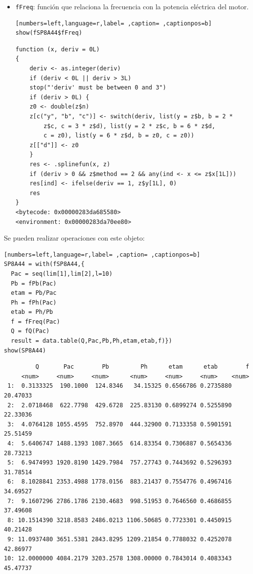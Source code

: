 \begin{itemize}
\begin{itemize}
\item \texttt{fFreq}: función que relaciona la frecuencia con la potencia eléctrica del motor.
\begin{lstlisting}[numbers=left,language=r,label= ,caption= ,captionpos=b]
show(fSP8A44$fFreq)
\end{lstlisting}

\begin{verbatim}
function (x, deriv = 0L) 
{
    deriv <- as.integer(deriv)
    if (deriv < 0L || deriv > 3L) 
	stop("'deriv' must be between 0 and 3")
    if (deriv > 0L) {
	z0 <- double(z$n)
	z[c("y", "b", "c")] <- switch(deriv, list(y = z$b, b = 2 * 
	    z$c, c = 3 * z$d), list(y = 2 * z$c, b = 6 * z$d, 
	    c = z0), list(y = 6 * z$d, b = z0, c = z0))
	z[["d"]] <- z0
    }
    res <- .splinefun(x, z)
    if (deriv > 0 && z$method == 2 && any(ind <- x <= z$x[1L])) 
	res[ind] <- ifelse(deriv == 1, z$y[1L], 0)
    res
}
<bytecode: 0x00000283da685580>
<environment: 0x00000283da70ee80>
\end{verbatim}
\end{itemize}

Se pueden realizar operaciones con este objeto:
\begin{lstlisting}[numbers=left,language=r,label= ,caption= ,captionpos=b]
SP8A44 = with(fSP8A44,{
  Pac = seq(lim[1],lim[2],l=10)
  Pb = fPb(Pac)
  etam = Pb/Pac
  Ph = fPh(Pac)
  etab = Ph/Pb
  f = fFreq(Pac)
  Q = fQ(Pac)
  result = data.table(Q,Pac,Pb,Ph,etam,etab,f)})
show(SP8A44)
\end{lstlisting}

\begin{verbatim}
	     Q       Pac        Pb         Ph      etam      etab        f
	 <num>     <num>     <num>      <num>     <num>     <num>    <num>
 1:  0.3133325  190.1000  124.8346   34.15325 0.6566786 0.2735880 20.47033
 2:  2.0718468  622.7798  429.6728  225.83130 0.6899274 0.5255890 22.33036
 3:  4.0764128 1055.4595  752.8970  444.32900 0.7133358 0.5901591 25.51459
 4:  5.6406747 1488.1393 1087.3665  614.83354 0.7306887 0.5654336 28.73213
 5:  6.9474993 1920.8190 1429.7984  757.27743 0.7443692 0.5296393 31.78514
 6:  8.1028841 2353.4988 1778.0156  883.21437 0.7554776 0.4967416 34.69527
 7:  9.1607296 2786.1786 2130.4683  998.51953 0.7646560 0.4686855 37.49608
 8: 10.1514390 3218.8583 2486.0213 1106.50685 0.7723301 0.4450915 40.21428
 9: 11.0937480 3651.5381 2843.8295 1209.21854 0.7788032 0.4252078 42.86977
10: 12.0000000 4084.2179 3203.2578 1308.00000 0.7843014 0.4083343 45.47737
\end{verbatim}


\end{itemize}
